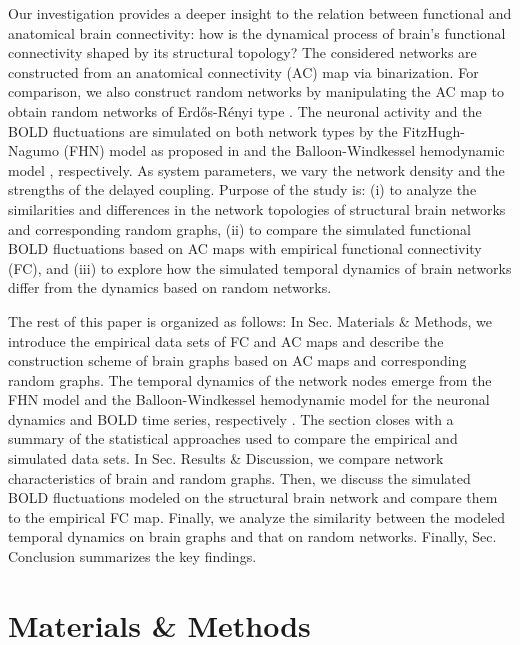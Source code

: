 \documentclass[fleqn,10pt]{wlpeerj}
\begin{document}
Our investigation provides a deeper insight to the relation between functional and anatomical brain connectivity: how
is the dynamical process of brain's functional connectivity shaped by its structural topology? The considered networks
are constructed from an anatomical connectivity (AC) map via binarization. For comparison, we also construct random
networks by manipulating the AC map to obtain random networks of Erd\H{o}s-R\'{e}nyi type \citep{XYZERD}. The neuronal
activity and the BOLD fluctuations are simulated on both network types by the FitzHugh-Nagumo (FHN) model as proposed in
\citep{GHO08, GHO08a, VUKnew} and the Balloon-Windkessel hemodynamic model \citep{FRI00}, respectively. As system parameters, we
vary the network density and the strengths of the delayed coupling. Purpose of the study is: (i) to analyze the similarities and differences in the network topologies
of structural brain networks and corresponding random graphs, (ii) to compare the simulated functional BOLD fluctuations
based on AC maps with empirical functional connectivity (FC), and (iii) to explore 
how the simulated temporal dynamics of brain networks differ from the dynamics based on random networks.

The rest of this paper is organized as follows: In Sec. Materials \& Methods, we introduce the empirical data sets of FC
and AC maps and describe the construction scheme of brain graphs based on AC maps and corresponding random graphs. The
temporal dynamics of the network nodes emerge from the FHN model and the Balloon-Windkessel hemodynamic model for the
neuronal dynamics and BOLD time series, respectively \citep{FIT61, FRI00}. The section  closes
with a summary of the statistical approaches used to compare the empirical and simulated data sets. In Sec. Results \&
Discussion, we compare network characteristics of brain and random graphs. Then, we discuss the simulated BOLD
fluctuations modeled on the structural brain network and compare them to the empirical FC map. Finally, we analyze the
similarity between the modeled temporal dynamics on brain graphs and that on random networks. Finally, Sec. Conclusion
summarizes the key findings.
 
\section*{Materials \& Methods}
\end{document}

